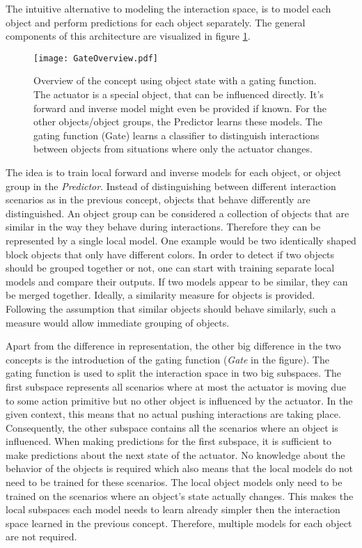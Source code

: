 The intuitive alternative to modeling the interaction space, is to model each object and perform predictions for each object separately. 
The general components of this architecture are visualized in figure \ref{fig:GateOverview}.

\begin{figure}[h]
	\centering
	\texttt{[image: GateOverview.pdf]}
	\caption{Overview of the concept using object state with a gating function. The actuator is a special object, that can be influenced directly. It's forward and inverse model might even be provided if known. For the other objects/object groups, the Predictor learns these models. The gating function (Gate) learns a classifier to distinguish interactions between objects from situations where only the actuator changes.} 
	\label{fig:GateOverview}
\end{figure}

The idea is to train local forward and inverse models for each object, or object group in the \textit{Predictor}. 
Instead of distinguishing between different interaction scenarios as in the previous concept, objects that behave differently are distinguished. 
An object group can be considered a collection of objects that are similar in the way they behave during interactions. Therefore they can be represented by a single local model. One example would be two identically shaped block objects that only have different colors. In order to detect if two objects should be grouped together or not, one can start with training separate local models and compare their outputs. If two models appear to be similar, they can be merged together. Ideally, a similarity measure for objects is provided. Following the assumption that similar objects should behave similarly, such a measure would allow immediate grouping of objects.

Apart from the difference in representation, the other big difference in the two concepts is the introduction of the gating function (\textit{Gate} in the figure). The gating function is used to split the interaction space in two big subspaces. The first subspace represents all scenarios where at most the actuator is moving due to some action primitive but no other object is influenced by the actuator. In the given context, this means that no actual pushing interactions are taking place.  Consequently, the other subspace contains all the scenarios where an object is influenced. When making predictions for the first subspace, it is sufficient to make predictions about the next state of the actuator. No knowledge about the behavior of the objects is required which also means that the local models do not need to be trained for these scenarios. The local object models only need to be trained on the scenarios where an object's state actually changes. 
This makes the local subspaces each model needs to learn already simpler then the interaction space learned in the previous concept. Therefore, multiple models for each object are not required.

